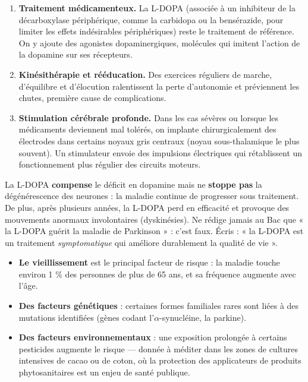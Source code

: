 \documentclass[11pt]{article}
\newcommand{\cle}[1]{{\popxbold\color{popdark}#1}}
\newcounter{popsec}
\newcounter{popsub}
\newcommand{\courssub}[1]{%
  \stepcounter{popsub}%
  \par\vspace{9pt}\noindent{\popxbold\fontsize{11.5}{13}\selectfont\color{popink}{\color{poporange}\thepopsec.\thepopsub}\hspace{6pt}#1}\par\nopagebreak\vspace{4pt}
}
\begin{document}
\begin{methode}
\begin{enumerate}
\item \textbf{Traitement médicamenteux.} La \cle{L-DOPA} (associée à un inhibiteur de la décarboxylase périphérique, comme la carbidopa ou la bensérazide, pour limiter les effets indésirables périphériques) reste le traitement de référence. On y ajoute des \cle{agonistes dopaminergiques}, molécules qui imitent l'action de la dopamine sur ses récepteurs.
\item \textbf{Kinésithérapie et rééducation.} Des exercices réguliers de marche, d'équilibre et d'élocution ralentissent la perte d'autonomie et préviennent les chutes, première cause de complications.
\item \textbf{Stimulation cérébrale profonde.} Dans les cas sévères ou lorsque les médicaments deviennent mal tolérés, on implante chirurgicalement des électrodes dans certains noyaux gris centraux (noyau sous-thalamique le plus souvent). Un stimulateur envoie des impulsions électriques qui rétablissent un fonctionnement plus régulier des circuits moteurs.
\end{enumerate}
\end{methode}

\begin{attention}
La L-DOPA \textbf{compense} le déficit en dopamine mais ne \textbf{stoppe pas} la dégénérescence des neurones : la maladie continue de progresser sous traitement. De plus, après plusieurs années, la L-DOPA perd en efficacité et provoque des mouvements anormaux involontaires (dyskinésies). Ne rédige jamais au Bac que « la L-DOPA guérit la maladie de Parkinson » : c'est faux. Écris : « la L-DOPA est un traitement \emph{symptomatique} qui améliore durablement la qualité de vie ».
\end{attention}

\courssub{Facteurs favorisants et prévention}

\begin{itemize}
\item \textbf{Le vieillissement} est le principal facteur de risque : la maladie touche environ 1 \% des personnes de plus de 65 ans, et sa fréquence augmente avec l'âge.
\item \textbf{Des facteurs génétiques} : certaines formes familiales rares sont liées à des mutations identifiées (gènes codant l'$\alpha$-synucléine, la parkine).
\item \textbf{Des facteurs environnementaux} : une exposition prolongée à certains pesticides augmente le risque — donnée à méditer dans les zones de cultures intensives de cacao ou de coton, où la protection des applicateurs de produits phytosanitaires est un enjeu de santé publique.
\end{itemize}
\end{document}
